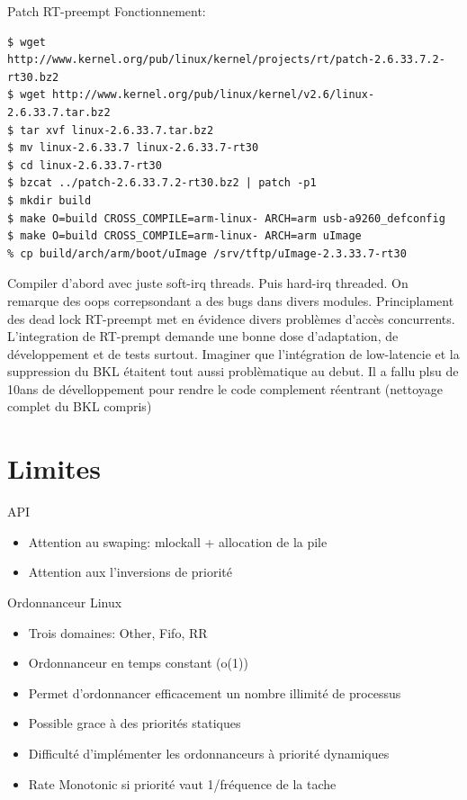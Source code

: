 \begin{frame}[fragile=singleslide]{Patch RT-preempt}
  Fonctionnement:
    \begin{lstlisting}
$ wget
http://www.kernel.org/pub/linux/kernel/projects/rt/patch-2.6.33.7.2-rt30.bz2
$ wget http://www.kernel.org/pub/linux/kernel/v2.6/linux-2.6.33.7.tar.bz2
$ tar xvf linux-2.6.33.7.tar.bz2
$ mv linux-2.6.33.7 linux-2.6.33.7-rt30
$ cd linux-2.6.33.7-rt30
$ bzcat ../patch-2.6.33.7.2-rt30.bz2 | patch -p1
$ mkdir build
$ make O=build CROSS_COMPILE=arm-linux- ARCH=arm usb-a9260_defconfig
$ make O=build CROSS_COMPILE=arm-linux- ARCH=arm uImage
% cp build/arch/arm/boot/uImage /srv/tftp/uImage-2.3.33.7-rt30
    \end{lstlisting} %
Compiler d'abord avec juste soft-irq threads. Puis hard-irq threaded. On remarque des oops correpsondant a des bugs dans divers modules. Principlament des dead lock
RT-preempt met en évidence divers problèmes d'accès concurrents. L'integration de RT-prempt demande une bonne dose d'adaptation, de développement et de tests surtout. Imaginer que l'intégration de low-latencie et la suppression du BKL étaitent tout aussi problèmatique au debut. Il a fallu plsu de 10ans de dévelloppement pour rendre le code complement réentrant (nettoyage complet du BKL compris)
\end{frame}

\section{Limites} %

\begin{frame}{API}
  \begin{itemize}
      \item Attention au swaping: mlockall + allocation de la pile
      \item Attention aux l'inversions de priorité
  \end{itemize}
\end{frame}

\begin{frame}{Ordonnanceur Linux}
  \begin{itemize}
  \item Trois domaines: Other, Fifo, RR
  \item Ordonnanceur en temps constant (o(1))
  \item  Permet  d'ordonnancer  efficacement  un  nombre  illimité  de
    processus
  \item Possible grace à des priorités statiques
  \item   Difficulté  d'implémenter   les  ordonnanceurs   à  priorité
    dynamiques
  \item Rate Monotonic si priorité vaut 1/fréquence de la tache
  \end{itemize}
\end{frame}

